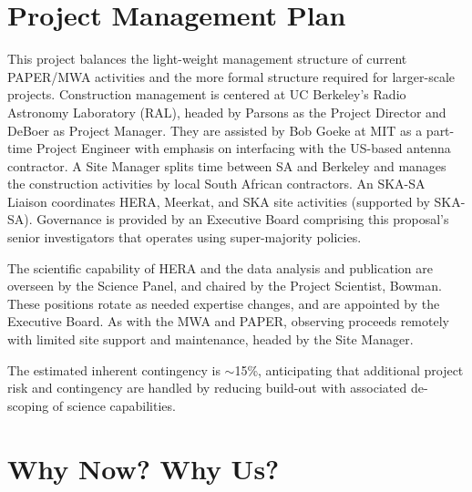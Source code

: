 \documentclass[preprint]{aastex}
\begin{document}
\vspace{-0.25in}
\section{Project Management Plan}
\label{PMPsec}

This project balances the light-weight management structure of current PAPER/MWA
activities and the more formal structure required for larger-scale projects.
Construction management is centered at UC Berkeley's Radio Astronomy Laboratory
(RAL), headed by Parsons as the Project Director and DeBoer as
Project Manager. 
They are assisted by Bob Goeke at MIT as a part-time
Project Engineer with emphasis on interfacing with the US-based
antenna contractor.  A Site Manager splits time between SA
and Berkeley and manages the construction activities by local South African
contractors. An SKA-SA Liaison coordinates HERA, Meerkat, and SKA site
activities (supported by SKA-SA). Governance is provided by an Executive Board comprising
this proposal's senior investigators that operates using
super-majority policies. 

The scientific capability of HERA and the data analysis and publication are
overseen by the Science Panel, and chaired by the Project Scientist, Bowman. These
positions rotate as needed expertise changes, and are appointed by the
Executive Board.  As with the MWA and PAPER, observing
proceeds remotely with limited site support
and maintenance, headed by the Site Manager.

The estimated inherent contingency is $\sim$15\%, anticipating that additional project 
risk and contingency are handled by reducing
build-out with associated de-scoping of science capabilities.

\vspace{-0.25in}
\section{Why Now? Why Us?}
\end{document}
